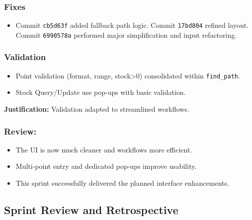 \subsubsection{Fixes}
\begin{itemize}
	\item Commit \verb|cb5d63f| added fallback path logic. Commit \verb|17bd804| refined layout. Commit \verb|6990578a| performed major simplification and input refactoring.
\end{itemize}

\subsubsection{Validation}
\begin{itemize}
	\item Point validation (format, range, stock>0) consolidated within \verb|find_path|.
	\item Stock Query/Update use pop-ups with basic validation.
\end{itemize}
\textbf{Justification:} Validation adapted to streamlined workflows.

\subsubsection{Review:}
\begin{itemize}
	\item The UI is now much cleaner and workflows more efficient.
	\item Multi-point entry and dedicated pop-ups improve usability.
	\item This sprint successfully delivered the planned interface enhancements.
\end{itemize}

\clearpage
\subsection{Sprint Review and Retrospective}

